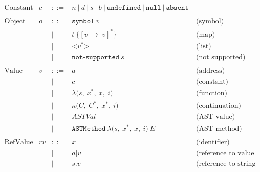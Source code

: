 \documentclass[11pt]{article}
\newcommand{\Term}[1]{\texttt{#1}}
\newcommand{\symctx}[0]{C}
\newcommand{\symctxstack}[0]{C^*}
\newcommand{\symast}[0]{ASTVal}
\newcommand{\symrefv}[0]{rv}
\newcommand{\symlist}[1]{\Term{<} #1 \Term{>}}
\newcommand{\valfunc}[4]{\lambda \Term{(} #1,\ #2,\ #3,\ #4 \Term{)}}
\newcommand{\valcont}[4]{\kappa \Term{(} #1,\ #2,\ #3,\ #4 \Term{)}}
\begin{document}
\[
\begin{array}{rrrll}
\text{Constant} & c & ::= & n\ |\ d\ |\ s\ |\ b\ |\
\Term{undefined}\ |\ \Term{null}\ |\ \Term{absent}\ & \\
\\
\text{Object} & o & ::= & \Term{symbol}\ v & \text{(symbol)}\\
&&|& t\ \Term{\{} [v\ \mapsto\ v]^* \Term{\}} & \text{(map)}\\
&&|& \symlist{v^*} & \text{(list)}\\
&&|& \Term{not-supported}\ s & \text{(not supported)}\\
\\
\text{Value} & v & ::= & a & \text{(address)} \\
&&|& c & \text{(constant)}\\
&&|& \valfunc{s}{x^*}{x}{i} & \text{(function)} \\
&&|& \valcont{\symctx}{\symctxstack}{x^*}{i} & \text{(continuation)} \\
&&|& \symast & \text{(AST value)}\\
&&|& \Term{ASTMethod}\ \valfunc{s}{x^*}{x}{i}\ E & \text{(AST method)}\\
\\

\text{RefValue} & \symrefv & ::= & x & \text{(identifier)}\\
&&|& a\Term{[} v \Term{]} & \text{(reference to value of map in heap)}\\
&&|& s\Term{.}v & \text{(reference to string field)}\\
\\


\end{array}
\]
\end{document}
